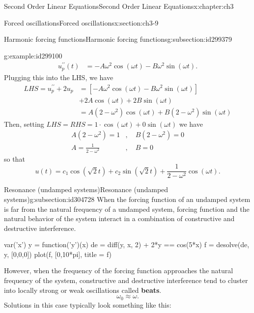 \documentclass[oneside,10pt,]{book}
\newcommand{\terminology}[1]{\textbf{#1}}
\numberwithin{equation}{section}
\numberwithin{equation}{section}
\newcommand{\amp}{&}
\begin{document}
\begin{chapterptx}{Second Order Linear Equations}{}{Second Order Linear Equations}{}{}{x:chapter:ch3}
\begin{sectionptx}{Forced oscillations}{}{Forced oscillations}{}{}{x:section:ch3-9}
\begin{subsectionptx}{Harmonic forcing functions}{}{Harmonic forcing functions}{}{}{g:subsection:id299379}
\begin{example}{}{g:example:id299100}
\begin{align*}
u_{p}^{\prime\prime}(t) \amp =-A\omega^{2}\cos\left(\omega t\right)-B\omega^{2}\sin\left(\omega t\right).
\end{align*}
Plugging this into the LHS, we have%
\begin{align*}
LHS=u_{p}^{\prime\prime}+2u_{p} \amp =\left[-A\omega^{2}\cos\left(\omega t\right)-B\omega^{2}\sin\left(\omega t\right)\right]\\
\amp +2A\cos\left(\omega t\right)+2B\sin\left(\omega t\right)\\
\amp =A\left(2-\omega^{2}\right)\cos\left(\omega t\right)+B\left(2-\omega^{2}\right)\sin\left(\omega t\right)
\end{align*}
Then, setting \(LHS=RHS=1\cdot\cos\left(\omega t\right)+0\sin\left(\omega t\right)\) we have%
\begin{align*}
A\left(2-\omega^{2}\right)=1 \amp ,\,\,\,\,\,\,B\left(2-\omega^{2}\right)=0\\
A=\frac{1}{2-\omega^{2}} \amp ,\,\,\,\,\,\,B=0
\end{align*}
so that%
\begin{equation*}
u(t)=c_{1}\cos\left(\sqrt{2}t\right)+c_{2}\sin\left(\sqrt{2}t\right)+\frac{1}{2-\omega^{2}}\cos\left(\omega t\right).
\end{equation*}
%
\end{example}
\end{subsectionptx}
%
%
\typeout{************************************************}
\typeout{************************************************}
%
\begin{subsectionptx}{Resonance (undamped systems)}{}{Resonance (undamped systems)}{}{}{g:subsection:id304728}
When the forcing function of an undamped system  is far from the natural frequency of a undamped system, forcing function and the natural behavior of the system interact in a combination of constructive and destructive interference. \leavevmode%
\begin{sageinput}
var('x')
y = function('y')(x)
de = diff(y, x, 2) + 2*y == cos(5*x)
f = desolve(de, y, [0,0,0])
plot(f, [0,10*pi], title = f)
\end{sageinput}
 However, when the frequency of the forcing function approaches the natural frequency of the system, constructive and destructive interference tend to cluster into locally strong or weak oscillations called \terminology{beats}.%
\begin{equation*}
\omega_{0}\approx\omega.
\end{equation*}
Solutions in this case typically look something like this: \begin{image}{0}{1}{0}%

\end{image}
\end{subsectionptx}
\end{sectionptx}
\end{chapterptx}
\end{document}
